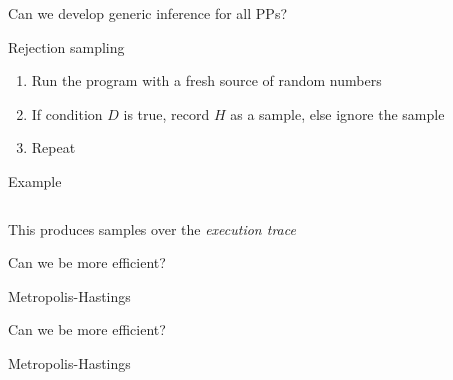 \begin{frame}{Can we develop generic inference for all PPs?}
  \begin{block}{Rejection sampling}
    \begin{enumerate}
      \item Run the program with a fresh source of random numbers
      \item If condition $D$ is true, record $H$ as a sample, else ignore the sample
      \item Repeat
    \end{enumerate}
  \end{block}
  \begin{block}{Example}
    \begin{columns}
      \begin{column}{.4\textwidth}
        
      \end{column}
      \begin{column}{.4\textwidth}
        
      \end{column}
    \end{columns}
  \end{block}
  \begin{block}{This produces samples over the \emph{execution trace}}
    \eg 
  \end{block}
\end{frame}

\begin{frame}{Can we be more efficient?}
  \begin{block}{Metropolis-Hastings}
    
  \end{block}
\end{frame}

\begin{frame}{Can we be more efficient?}
  \begin{block}{Metropolis-Hastings}
    
  \end{block}
\end{frame}

